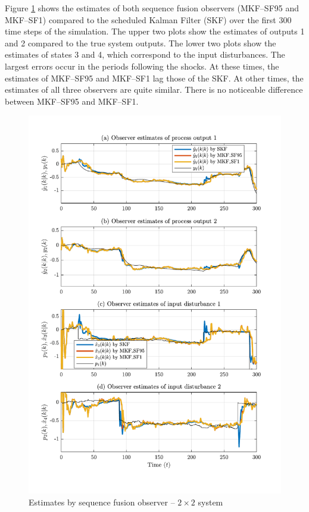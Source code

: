 Figure \ref{fig:rod-obs-sim2-yest-1-SF} shows the estimates of both sequence fusion observers (MKF--SF95 and MKF--SF1) compared to the scheduled Kalman Filter (\acrshort{SKF}) over the first 300 time steps of the simulation. The upper two plots show the estimates of outputs 1 and 2 compared to the true system outputs. The lower two plots show the estimates of states 3 and 4, which correspond to the input disturbances. The largest errors occur in the periods following the shocks. At these times, the estimates of MKF--SF95 and MKF--SF1 lag those of the \gls{SKF}. At other times, the estimates of all three observers are quite similar. There is no noticeable difference between MKF--SF95 and MKF--SF1.
\begin{figure}[htp]
	\centering
	\includegraphics[width=13cm]{images/rod_obs_sim3_all_seed_y_est1_SF95_SF1.pdf}
	\caption{Estimates by sequence fusion observer –  $2\times2$ system}
	\label{fig:rod-obs-sim2-yest-1-SF}
\end{figure}

